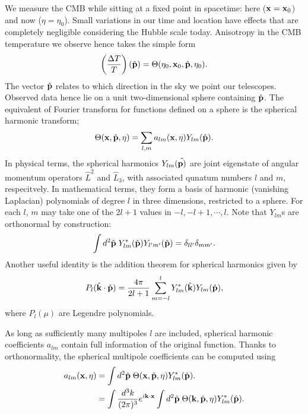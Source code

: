 We measure the CMB while sitting at a fixed point in spacetime: here ($\mathbf{x}=\mathbf{x}_0$) and now ($\eta=\eta_0$). Small variations in our time and location have effects that are completely negligible considering the Hubble scale today. Anisotropy in the CMB temperature we observe hence takes the simple form
\begin{align}
	\left( \frac{\Delta T}{T} \right) (\hat{\mathbf{p}}) = \Theta(\eta_0, \mathbf{x}_0, \hat{\mathbf{p}}, \eta_0).
\end{align}
The vector $\hat{\mathbf{p}}$ relates to which direction in the sky we point our telescopes. Observed data hence lie on a unit two-dimensional sphere containing $\hat{\mathbf{p}}$. The equivalent of Fourier transform for functions defined on a sphere is the spherical harmonic transform;
\begin{align}
	\Theta(\mathbf{x}, \hat{\mathbf{p}}, \eta) = \sum_{l,m} a_{lm}(\mathbf{x},\eta) Y_{lm}(\hat{\mathbf{p}}). 
\end{align} 
In physical terms, the spherical harmonics $Y_{lm}(\hat{\mathbf{p})}$ are joint eigenstate of angular momentum operators $\hat{L}^2$ and $\hat{L}_3$, with associated qunatum numbers $l$ and $m$, respecitvely. In mathematical terms, they form a basis of harmonic (vanishing Laplacian) polynomials of degree $l$ in three dimensions, restricted to a sphere. For each $l$, $m$ may take one of the $2l+1$ values in ${-l,-l+1,\cdots,l}$. Note that $Y_{lm}$s are orthonormal by construction:
\begin{align}
	\int d^2\hat{\mathbf{p}} \; Y^*_{lm} (\hat{\mathbf{p}}) Y_{l'm'} (\hat{\mathbf{p}}) = \delta_{ll'} \delta_{mm'}. \label{eqn:spherical_harmonic_orthonormality}
\end{align}
Another useful identity is the addition theorem for spherical harmonics given by
\begin{align}
	P_l (\hat{\mathbf{k}} \cdot \hat{\mathbf{p}}) = \frac{4\pi}{2l+1} \sum_{m=-l}^{l} Y^*_{lm} (\hat{\mathbf{k}}) Y_{lm} (\hat{\mathbf{p}}), \label{eqn:harmonic_addition_theorem}
\end{align}
where $P_l(\mu)$ are Legendre polynomials.
	
As long as sufficiently many multipoles $l$ are included, spherical harmonic coefficients $a_{lm}$ contain full information of the original function. Thanks to orthonormality, the spherical multipole coefficients can be computed using
\begin{align}
	a_{lm} (\mathbf{x},\eta) &= \int d^2\hat{\mathbf{p}} \; \Theta(\mathbf{x}, \hat{\mathbf{p}},\eta) Y^*_{lm} (\hat{\mathbf{p}}). \\
	&= \int \frac{d^3 k}{(2\pi)^3} e^{i\mathbf{k}\cdot\mathbf{x}} \int d^2\hat{\mathbf{p}} \; \Theta(\mathbf{k},\hat{\mathbf{p}},\eta) Y^*_{lm}(\hat{\mathbf{p}}). \label{eqn:alm_derivation_alm_using_theta}
\end{align}

